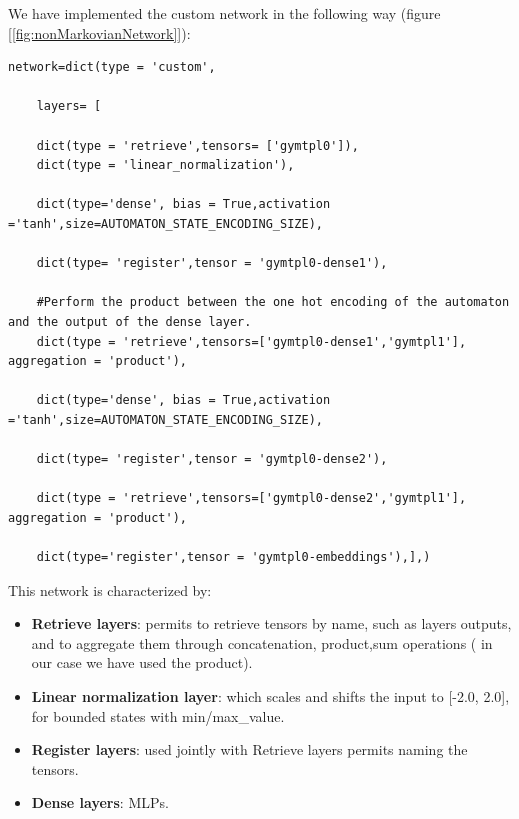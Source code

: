 \documentclass{article}
\begin{document}

\label{network}
We have implemented the custom network in the following way (figure [\ref{fig:nonMarkovianNetwork}]):\\
\begin{lstlisting}
network=dict(type = 'custom', 

    layers= [
    
    dict(type = 'retrieve',tensors= ['gymtpl0']),
    dict(type = 'linear_normalization'),
    
    dict(type='dense', bias = True,activation ='tanh',size=AUTOMATON_STATE_ENCODING_SIZE),
    
    dict(type= 'register',tensor = 'gymtpl0-dense1'),
    
    #Perform the product between the one hot encoding of the automaton and the output of the dense layer.
    dict(type = 'retrieve',tensors=['gymtpl0-dense1','gymtpl1'], aggregation = 'product'),
    
    dict(type='dense', bias = True,activation ='tanh',size=AUTOMATON_STATE_ENCODING_SIZE),
    
    dict(type= 'register',tensor = 'gymtpl0-dense2'), 
    
    dict(type = 'retrieve',tensors=['gymtpl0-dense2','gymtpl1'], aggregation = 'product'),
    
    dict(type='register',tensor = 'gymtpl0-embeddings'),],)
\end{lstlisting}

\noindent
This network is characterized by:\\
\begin{itemize}
    \item \textbf{Retrieve layers}: permits to retrieve tensors by name, such as layers outputs, and to aggregate them through concatenation, product,sum operations ( in our case we have used the product). 
    \item \textbf{Linear normalization layer}:  which scales and shifts the input to [-2.0, 2.0], for bounded states with min/max\_value. 
    \item \textbf{Register layers}: used jointly with Retrieve layers permits naming the tensors.
    \item \textbf{Dense layers}: MLPs.
\end{itemize}
\end{document}
